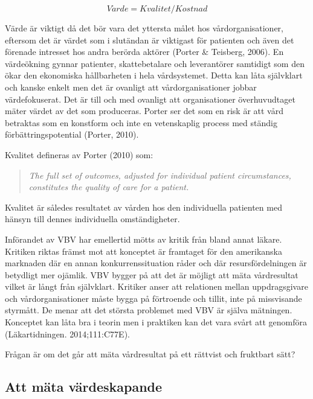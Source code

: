 \begin{equation}
\label{eq:varde}
	V \ddot{a} rde = Kvalitet/Kostnad
\end{equation}

Värde är viktigt då det bör vara det yttersta målet hos vårdorganisationer, eftersom det är värdet som i slutändan är viktigast för patienten och även det förenade intresset hos andra berörda aktörer (Porter \& Teisberg, 2006). En värdeökning gynnar patienter, skattebetalare och leverantörer samtidigt som den ökar den ekonomiska hållbarheten i hela vårdsystemet. Detta kan låta självklart och kanske enkelt men det är ovanligt att vårdorganisationer jobbar värdefokuserat. Det är till och med ovanligt att organisationer överhuvudtaget mäter värdet av det som produceras. Porter ser det som en risk är att vård betraktas som en konstform och inte en vetenskaplig process med ständig förbättringspotential (Porter, 2010).
 
Kvalitet defineras av Porter (2010) som:
\begin{quotation}
\textit{The full set of outcomes, adjusted for individual patient circumstances, constitutes the quality of care for a patient.}
\end{quotation}
Kvalitet är således resultatet av vården hos den individuella patienten med hänsyn till dennes individuella omständigheter.

Införandet av VBV har emellertid mötts av kritik från bland annat läkare. Kritiken riktas främst mot att konceptet är framtaget för den amerikanska marknaden där en annan konkurrenssituation råder och där resursfördelningen är betydligt mer ojämlik. VBV bygger på att det är möjligt att mäta vårdresultat vilket är långt från självklart. Kritiker anser att relationen mellan uppdragsgivare och vårdorganisationer måste bygga på förtroende och tillit, inte på missvisande styrmått. De menar att det största problemet med VBV är själva mätningen. Konceptet kan låta bra i teorin men i praktiken kan det vara svårt att genomföra (Läkartidningen. 2014;111:C77E). 

Frågan är om det går att mäta vårdresultat på ett rättvist och fruktbart sätt?

\subsection{Att mäta värdeskapande}

